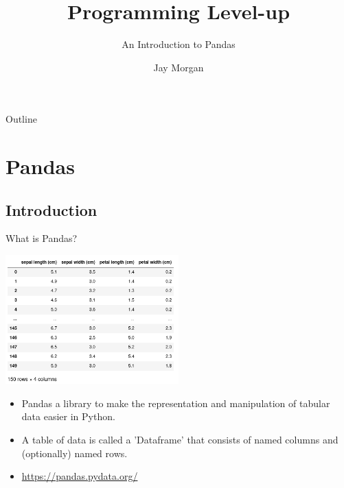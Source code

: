 \documentclass[10pt]{beamer}
\author{Jay Morgan}
\date{}
\title{Programming Level-up}
\subtitle{An Introduction to Pandas}
\begin{document}
\maketitle
\begin{frame}{Outline}
\tableofcontents
\end{frame}


\section{Pandas}
\label{sec:org5cb47ad}

\subsection{Introduction}
\label{sec:org7e60002}

\begin{frame}[label={sec:org54a2763}]{What is Pandas?}
\begin{center}
\includegraphics[width=0.5\textwidth]{./images/pandas.jpg}
\end{center}

\begin{itemize}
\item Pandas a library to make the representation and manipulation of tabular data
easier in Python.
\item A table of data is called a 'Dataframe' that consists of named columns and
(optionally) named rows.
\item \url{https://pandas.pydata.org/}
\end{itemize}
\end{frame}
\end{document}
